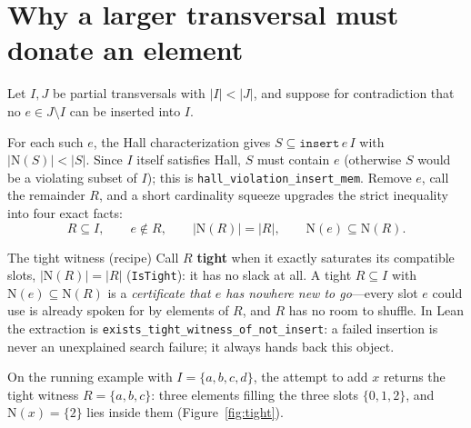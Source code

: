 \documentclass[11pt]{article}
\newcommand{\lean}[1]{\texttt{#1}}
\newcommand{\N}{\mathrm{N}}
\begin{document}
\section{Why a larger transversal must donate an element}\label{sec:q2}

Let $I,J$ be partial transversals with $|I|<|J|$, and suppose for contradiction that no
$e\in J\setminus I$ can be inserted into $I$.

For each such $e$, the Hall characterization gives $S\subseteq \lean{insert}\,e\,I$ with
$|\N(S)|<|S|$. Since $I$ itself satisfies Hall, $S$ must contain $e$ (otherwise $S$ would be a
violating subset of $I$); this is \lean{hall\_violation\_insert\_mem}. Remove $e$, call the
remainder $R$, and a short cardinality squeeze upgrades the strict inequality into four exact
facts:
\[
  R\subseteq I,\qquad e\notin R,\qquad |\N(R)|=|R|,\qquad \N(e)\subseteq \N(R).
\]

\begin{recipebox}{The tight witness (recipe)}
Call $R$ \textbf{tight} when it exactly saturates its compatible slots, $|\N(R)|=|R|$
(\lean{IsTight}): it has no slack at all. A tight $R\subseteq I$ with $\N(e)\subseteq\N(R)$ is a \emph{certificate that $e$ has
nowhere new to go}---every slot $e$ could use is already spoken for by elements of $R$, and $R$ has
no room to shuffle. In Lean the extraction is
\lean{exists\_tight\_witness\_of\_not\_insert}: a failed insertion is never an unexplained search
failure; it always hands back this object.
\end{recipebox}

On the running example with $I=\{a,b,c,d\}$, the attempt to add $x$ returns the tight witness
$R=\{a,b,c\}$: three elements filling the three slots $\{0,1,2\}$, and $\N(x)=\{2\}$ lies inside
them (Figure~\ref{fig:tight}).
\end{document}

